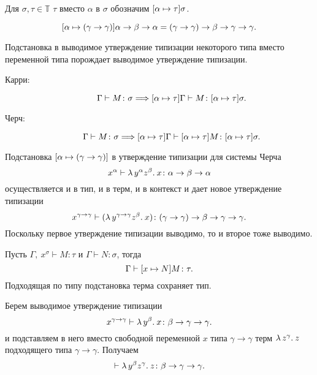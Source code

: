 \documentclass[11pt,a4paper]{article}
\begin{document}
\begin{defn}
	Для $ \sigma , \tau \in \mathbb{T}$  $ \tau $ вместо $ \alpha $ в $ \sigma $ обозначим $ [\alpha \mapsto \tau] \sigma$.
\end{defn}
\begin{ex}
	\[
		[ \alpha  \mapsto ( \gamma  \to \gamma )]  \alpha \to  \beta  \to  \alpha = ( \gamma \to  \gamma ) \to  \beta \to  \gamma  \to \gamma 
		.\]
\end{ex}
\begin{lm}
	Подстановка в выводимое утверждение типизации некоторого типа вместо переменной типа порождает выводимое утверждение типизации.
	\begin{description}
		\item[Карри:] 
			\[
				\Gamma \vdash M\colon \sigma  \Longrightarrow [ \alpha  \mapsto  \tau ] \Gamma \vdash M \colon [ \alpha  \mapsto  \tau ]  \sigma
			.\] 
		\item[Черч:]
			\[
				\Gamma \vdash M\colon \sigma  \Longrightarrow [ \alpha  \mapsto  \tau ] \Gamma \vdash [ \alpha  \mapsto  \tau ] M \colon [ \alpha  \mapsto  \tau ]  \sigma
			.\] 
	\end{description}
\end{lm}
\begin{ex}
	Подстановка $[ \alpha  \mapsto  (\gamma \to  \gamma )]$ в утверждение типизации для системы Черча
	\[
		x^{ \alpha } \vdash \lambda\,{y^{\alpha} z^{ \beta }}.\:{x}\colon \alpha  \to  \beta  \to  \alpha 
	\] 
осуществляется и в тип, и в терм, и в контекст и дает новое утверждение типизации
\[
	x^{\gamma \to \gamma } \vdash (\lambda\,{y ^{ \gamma  \to  \gamma } z ^{ \beta }}.\:{x})\colon ( \gamma \to  \gamma ) \to  \beta \to \gamma  \to  \gamma 
.\] 
Поскольку первое утверждение типизации выводимо, то и второе тоже
выводимо.
\end{ex}
\begin{lm}
	Пусть $ \Gamma , ~ x^{\sigma} \vdash M\colon \tau $ и $ \Gamma \vdash N\colon \sigma $, тогда
	\[
		\Gamma \vdash [x \mapsto N] M\colon \tau 
	.\] 
	Подходящая по типу подстановка терма сохраняет тип.
\end{lm}
\begin{ex}
	Берем выводимое утверждение типизации
	\[
		x^{ \gamma \to \gamma }\vdash \lambda\,{y^{ \beta }}.\:{x} \colon \beta  \to \gamma \to \gamma 
	.\] 
	и подставляем в него вместо свободной переменной $ x$ типа $ \gamma  \to  \gamma $ терм $\lambda\,{z ^{\gamma}}.\:{z}$ подходящего типа $ \gamma  \to  \gamma $. 
	Получаем
	\[
		\vdash \lambda\,{y^{\beta}z^{\gamma}}.\:{z}\colon \beta \to \gamma \to  \gamma 
	.\] 
\end{ex}
\end{document}

